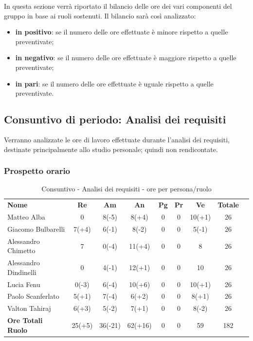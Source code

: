 
In questa sezione verrà riportato il bilancio delle ore dei vari componenti del gruppo in base ai ruoli sostenuti. Il bilancio sarà così analizzato:
\begin{itemize}
	\item {\bfseries in positivo}: se il numero delle ore effettuate è minore rispetto a quelle preventivate;
	\item {\bfseries in negativo}: se il numero delle ore effettuate è maggiore rispetto a quelle preventivate;
	\item {\bfseries in pari}: se il numero delle ore effettuate è uguale rispetto a quelle preventivate. \\
\end{itemize}

\subsection {Consuntivo di periodo: Analisi dei requisiti}
Verranno analizzate le ore di lavoro effettuate durante l'analisi dei requisiti, destinate principalmente allo studio personale; quindi non rendicontate.
\subsubsection{Prospetto orario}
	\begin{table} [h!]
	\begin{center}
		\begin{tabular} { m{6 cm} c c c c c c c c }
			\rowcolor{lightgray}
			\textbf{Nome} & \textbf{Re} & \textbf{Am} & \textbf{An} & \textbf{Pg} &\textbf{Pr} & \textbf{Ve} & \textbf{Totale} \\ 
			Matteo Alba & 0 & 8(-5) &8(+4) & 0 & 0 & 10(+1) & 26  \\ 
			Giacomo Bulbarelli & 7(+4) & 6(-1) & 8(-2) & 0 & 0 & 5(-1) & 26 \\ 
			Alessandro Chimetto & 7 & 0(-4) & 11(+4) & 0 & 0 & 8 & 26 \\
			Alessandro Dindinelli & 0 & 4(-1) & 12(+1) & 0 & 0 & 10 & 26 \\
			Lucia Fenu & 0(-3) & 6(-4) & 10(+6) & 0 & 0 & 10(+1) & 26 \\
			Paolo Scanferlato & 5(+1) & 7(-4) & 6(+2) & 0 & 0 & 8(+1) & 26 \\
			Valton Tahiraj & 6(+3) & 5(-2) &7(+1) & 0 & 0 & 8(-2) & 26 \\
			\textbf{Ore Totali Ruolo} & 25(+5) & 36(-21) & 62(+16) & 0 & 0 & 59 & 182\\
		
		\end{tabular}
		\caption{Consuntivo - Analisi dei requisiti - ore per persona/ruolo}
	\end{center}
\end{table}

